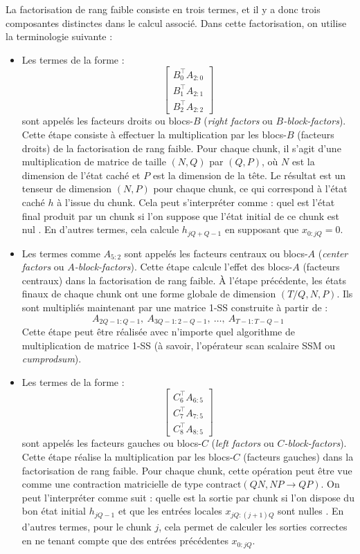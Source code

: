 La factorisation de rang faible consiste en trois termes, et il y a donc trois composantes distinctes dans le calcul associé. Dans cette factorisation, on utilise la terminologie suivante :

\begin{itemize}
    \item Les termes de la forme :
    \[
    \begin{bmatrix}
    B_0^\top A_{2:0} \\
    B_1^\top A_{2:1} \\
    B_2^\top A_{2:2}
    \end{bmatrix}
    \]
    sont appelés les facteurs droits ou blocs-$B$ (\emph{right factors} ou \emph{$B$-block-factors}). Cette étape consiste à effectuer la multiplication par les blocs-$B$ (facteurs droits) de la factorisation de rang faible. Pour chaque chunk, il s'agit d'une multiplication de matrice de taille $(N, Q)$ par $(Q, P)$, où $N$ est la dimension de l’état caché et $P$ est la dimension de la tête. Le résultat est un tenseur de dimension $(N, P)$ pour chaque chunk, ce qui correspond à l’état caché $h$ à l’issue du chunk. Cela peut s’interpréter comme : \og quel est l’état final produit par un chunk si l’on suppose que l’état initial de ce chunk est nul \fg. En d’autres termes, cela calcule $h_{jQ+Q-1}$ en supposant que $x_{0:jQ} = 0$.

    \item Les termes comme $A_{5:2}$ sont appelés les facteurs centraux ou blocs-$A$ (\emph{center factors} ou \emph{$A$-block-factors}). Cette étape calcule l’effet des blocs-$A$ (facteurs centraux) dans la factorisation de rang faible. À l’étape précédente, les états finaux de chaque chunk ont une forme globale de dimension $(T/Q, N, P)$. Ils sont multipliés maintenant par une matrice 1-SS construite à partir de :
    \[
    A_{2Q-1:Q-1},\ A_{3Q-1:2-Q-1},\ \dots,\ A_{T-1:T-Q-1}
    \]
    Cette étape peut être réalisée avec n’importe quel algorithme de multiplication de matrice 1-SS (à savoir, l’opérateur scan scalaire SSM ou \emph{cumprodsum}).
    \item Les termes de la forme :
    \[
    \begin{bmatrix}
    C_6^\top A_{6:5} \\
    C_7^\top A_{7:5} \\
    C_8^\top A_{8:5}
    \end{bmatrix}
    \]
    sont appelés les facteurs gauches ou blocs-$C$ (\emph{left factors} ou \emph{$C$-block-factors}). Cette étape réalise la multiplication par les blocs-$C$ (facteurs gauches) dans la factorisation de rang faible. Pour chaque chunk, cette opération peut \^etre vue comme une contraction matricielle de type $\text{contract}(QN, NP \rightarrow QP)$. On peut l'interpréter comme suit : \og quelle est la sortie par chunk si l'on dispose du bon état initial $h_{jQ-1}$ et que les entrées locales $x_{jQ:(j+1)Q}$ sont nulles \fg. En d'autres termes, pour le chunk $j$, cela permet de calculer les sorties correctes en ne tenant compte que des entrées précédentes $x_{0:jQ}$.
\end{itemize}

